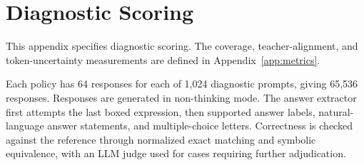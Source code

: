 \documentclass[]{jingdong}
\theoremstyle{plain}
\theoremstyle{definition}
\theoremstyle{remark}
\begin{document}
\clearpage
\section{Diagnostic Scoring}
\label{app:response-processing}

This appendix specifies diagnostic scoring. The coverage, teacher-alignment, and token-uncertainty measurements are defined in Appendix~\ref{app:metrics}.

Each policy has 64 responses for each of 1,024 diagnostic prompts, giving 65,536 responses. Responses are generated in non-thinking mode. The answer extractor first attempts the last boxed expression, then supported answer labels, natural-language answer statements, and multiple-choice letters. Correctness is checked against the reference through normalized exact matching and symbolic equivalence, with an LLM judge used for cases requiring further adjudication.

\clearpage
\endgroup
\end{document}
